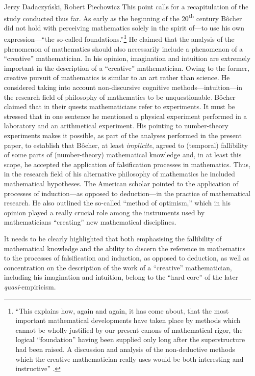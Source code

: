\begin{artengenv}{Jerzy Dadaczyński, Robert Piechowicz}
This point calls for a recapitulation of the study conducted thus far. As early as the beginning of the 20\textsuperscript{th} century Bôcher did not hold with perceiving mathematics solely in the spirit of---to use his own expression---``the so-called foundations.''\footnote{``This explains how, again and again, it has come about, that the most important mathematical developments have taken place by methods which cannot be wholly justified by our present canons of mathematical rigor, the logical ``foundation'' having been supplied only long after the superstructure had been raised. A discussion and analysis of the non-deductive methods which the creative mathematician really uses would be both interesting and instructive''
\parencite[][p.134]{bocher_fundamental_1904}.%
} He claimed that the analysis of the phenomenon of mathematics should also necessarily include a phenomenon of a ``creative'' mathematician. In his opinion, imagination and intuition are extremely important in the description of a ``creative'' mathematician. Owing to the former, creative pursuit of mathematics is similar to an art rather than science. He considered taking into account non-discursive cognitive methods---intuition---in the research field of philosophy of mathematics to be unquestionable. Bôcher claimed that in their quests mathematicians refer to experiments. It must be stressed that in one sentence he mentioned a physical experiment performed in a laboratory and an arithmetical experiment. His pointing to number-theory experiments makes it possible, as part of the analyses performed in the present paper, to establish that Bôcher, at least \textit{implicite}, agreed to (temporal) fallibility of some parts of (number-theory) mathematical knowledge and, in at least this scope, he accepted the application of falsification processes in mathematics. Thus, in the research field of his alternative philosophy of mathematics he included mathematical hypotheses. The American scholar pointed to the application of processes of induction---as opposed to deduction---in the practice of mathematical research. He also outlined the so-called ``method of optimism,'' which in his opinion played a really crucial role among the instruments used by mathematicians ``creating'' new mathematical disciplines.

It needs to be clearly highlighted that both emphasising the fallibility of mathematical knowledge and the ability to discern the reference in mathematics to the processes of falsification and induction, as opposed to deduction, as well as concentration on the description of the work of a ``creative'' mathematician, including his imagination and intuition, belong to the ``hard core'' of the later \textit{quasi}-empiricism.


\end{artengenv}

